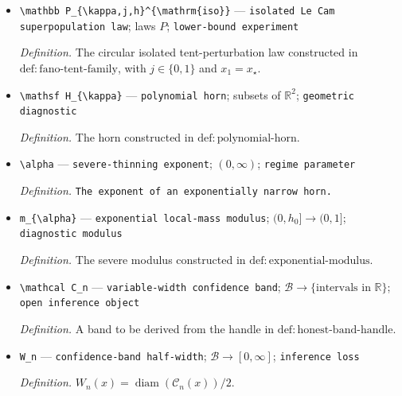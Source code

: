 \documentclass{article}
\begin{document}
\begin{itemize}
  \par\smallskip\noindent\emph{Definition.} The circular pervasive tent-perturbation law constructed in \(\mathrm{def:fano\text{-}tent\text{-}family}\).
  \item \texttt{\textbackslash{}\allowbreak{}mathbb P\_\allowbreak{}\{\textbackslash{}\allowbreak{}kappa,\allowbreak{}j,\allowbreak{}h\}\allowbreak{}\textasciicircum{}\{\textbackslash{}\allowbreak{}mathrm\{iso\}\allowbreak{}\}\allowbreak{}} --- \texttt{isolated Le Cam superpopulation law}; laws \(P\); \texttt{lower-\allowbreak{}bound experiment}
  \par\smallskip\noindent\emph{Definition.} The circular isolated tent-perturbation law constructed in \(\mathrm{def:fano\text{-}tent\text{-}family}\), with \(j\in\{0,1\}\) and \(x_1=x_{\star}\).
  \item \texttt{\textbackslash{}\allowbreak{}mathsf H\_\allowbreak{}\{\textbackslash{}\allowbreak{}kappa\}\allowbreak{}} --- \texttt{polynomial horn}; subsets of \(\mathbb R^2\); \texttt{geometric diagnostic}
  \par\smallskip\noindent\emph{Definition.} The horn constructed in \(\mathrm{def:polynomial\text{-}horn}\).
  \item \texttt{\textbackslash{}\allowbreak{}alpha} --- \texttt{severe-\allowbreak{}thinning exponent}; \((0,\infty)\); \texttt{regime parameter}
  \par\smallskip\noindent\emph{Definition.} \texttt{The exponent of an exponentially narrow horn.}
  \item \texttt{m\_\allowbreak{}\{\textbackslash{}\allowbreak{}alpha\}\allowbreak{}} --- \texttt{exponential local-\allowbreak{}mass modulus}; \((0,h_0]\to(0,1]\); \texttt{diagnostic modulus}
  \par\smallskip\noindent\emph{Definition.} The severe modulus constructed in \(\mathrm{def:exponential\text{-}modulus}\).
  \item \texttt{\textbackslash{}\allowbreak{}mathcal C\_\allowbreak{}n} --- \texttt{variable-\allowbreak{}width confidence band}; \(\mathcal B\to\{\text{intervals in }\mathbb R\}\); \texttt{open inference object}
  \par\smallskip\noindent\emph{Definition.} A band to be derived from the handle in \(\mathrm{def:honest\text{-}band\text{-}handle}\).
  \item \texttt{W\_\allowbreak{}n} --- \texttt{confidence-\allowbreak{}band half-\allowbreak{}width}; \(\mathcal B\to[0,\infty]\); \texttt{inference loss}
  \par\smallskip\noindent\emph{Definition.} \(W_n(x)=\operatorname{diam}(\mathcal C_n(x))/2\).

\end{itemize}
\end{document}
